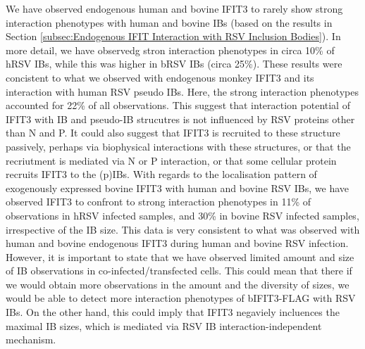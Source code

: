 We have observed endogenous human and bovine IFIT3 to rarely show strong interaction phenotypes with human and bovine IBs (based on the results in Section \ref{subsec:Endogenous IFIT Interaction with RSV Inclusion Bodies}). In more detail, we have observedg stron interaction phenotypes in circa 10\% of hRSV IBs, while this was higher in bRSV IBs (circa 25\%). These results were concistent to what we observed with endogenous monkey IFIT3 and its interaction with human RSV pseudo IBs. Here, the strong interaction phenotypes accounted for 22\% of all observations. This suggest that interaction potential of IFIT3 with IB and pseudo-IB strucutres is not influenced by RSV proteins other than N and P. It could also suggest that IFIT3 is recruited to these structure passively, perhaps via biophysical interactions with these structures, or that the recriutment is mediated via N or P interaction, or that some cellular protein recruits IFIT3 to the (p)IBs. With regards to the localisation pattern of exogenously expressed bovine IFIT3 with human and bovine RSV IBs, we have observed IFIT3 to confront to strong interaction phenotypes in 11\% of observations in hRSV infected samples, and 30\% in bovine RSV infected samples, irrespective of the IB size. This data is very consistent to what was observed with human and bovine endogenous IFIT3 during human and bovine RSV infection. However, it is important to state that we have observed limited amount and size of IB observations in co-infected/transfected cells. This could mean that there if we would obtain more observations in the amount and the diversity of sizes, we would be able to detect more interaction phenotypes of bIFIT3-FLAG with RSV IBs. On the other hand, this could imply that IFIT3 negaviely incluences the maximal IB sizes, which is mediated via RSV IB interaction-independent mechanism.

